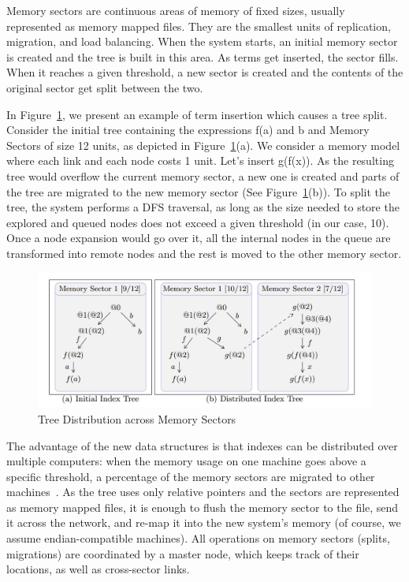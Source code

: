 \documentclass{deliverablereport}
\begin{document}
Memory sectors are continuous areas of memory of fixed sizes, usually represented as memory mapped files. They are the smallest units of replication, migration, and load balancing. When the system starts, an initial memory sector is created and the tree is built in this area. As terms get inserted, the sector fills. When it reaches a given threshold, a new sector is created and the contents of the original sector get split between the two. 

In Figure~\ref{fig:memory_sectors}, we present an example of term insertion which causes a tree split. Consider the initial tree containing the expressions f(a) and b and Memory Sectors of size 12 units, as depicted in Figure~\ref{fig:memory_sectors}(a). We consider a memory model where each link and each node costs 1 unit. Let’s insert g(f(x)). As the resulting tree would overflow the current memory sector, a new one is created and parts of the tree are migrated to the new memory sector (See Figure~\ref{fig:memory_sectors}(b)). To split the tree, the system performs a DFS traversal, as long as the size needed to store the explored and queued nodes does not exceed a given threshold (in our case, 10). Once a node expansion would go over it, all the internal nodes in the queue are transformed into remote nodes and the rest is moved to the other memory sector. 

\begin{figure}[h]
\centering
 \includegraphics[scale=0.6]{figure4.jpg}
 \caption{Tree Distribution across Memory Sectors}
 \label{fig:memory_sectors}
\end{figure}

The advantage of the new data structures is that indexes can be distributed over multiple computers: when the memory usage on one machine goes above a specific threshold, a percentage of the memory sectors are migrated to other machines~\cite{ProKoh:mwsofse11}. As the tree uses only relative pointers and the sectors are represented as memory mapped files, it is enough to flush the memory sector to the file, send it across the network, and re-map it into the new system’s memory (of course, we assume endian-compatible machines). All operations on memory sectors (splits, migrations) are coordinated by a master node, which keeps track of their locations, as well as cross-sector links. 
\end{document}
